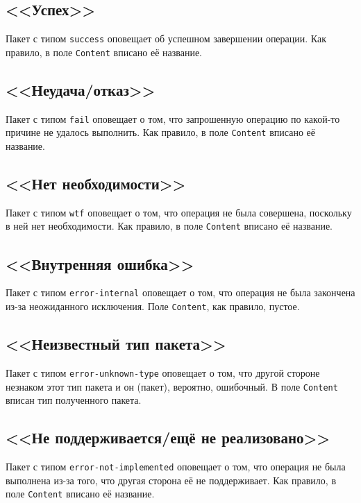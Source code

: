 \documentclass[a4paper,12pt]{book}
\begin{document}
\subsection{<<Успех>>}

Пакет с типом \texttt{success} оповещает об успешном завершении операции. Как правило, в поле \texttt{Content} вписано её название.

\subsection{<<Неудача/отказ>>}

Пакет с типом \texttt{fail} оповещает о том, что запрошенную операцию по какой-то причине не удалось выполнить. Как правило, в поле \texttt{Content} вписано её название.

\subsection{<<Нет необходимости>>}

Пакет с типом \texttt{wtf} оповещает о том, что операция не была совершена, поскольку в ней нет необходимости. Как правило, в поле \texttt{Content} вписано её название.

\subsection{<<Внутренняя ошибка>>}

Пакет с типом \texttt{error-internal} оповещает о том, что операция не была закончена из-за неожиданного исключения. Поле \texttt{Content}, как правило, пустое.

\subsection{<<Неизвестный тип пакета>>}

Пакет с типом \texttt{error-unknown-type} оповещает о том, что другой стороне незнаком этот тип пакета и он (пакет), вероятно, ошибочный. В поле \texttt{Content} вписан тип полученного пакета.

\subsection{<<Не поддерживается/ещё не \mbox{реализовано}>>}

Пакет с типом \texttt{error-not-implemented} оповещает о том, что операция не была выполнена из-за того, что другая сторона её не поддерживает. Как правило, в поле \texttt{Content} вписано её название.
\end{document}
